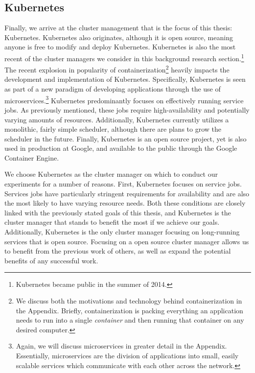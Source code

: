 \documentclass[twoside]{report}
\begin{document}
\subsection{Kubernetes}

Finally, we arrive at the cluster management that is the focus of this thesis:
Kubernetes. Kubernetes also originates, although it is open source, meaning
anyone is free to modify and deploy Kubernetes. Kubernetes is also the most
recent of the cluster managers we consider in this background research
section.\footnote{Kubernetes became public in the summer of 2014.} The recent
explosion in popularity of containerization\footnote{We discuss both the motivations and
technology behind containerization in the Appendix. Briefly, containerization is
packing everything an application needs to run into a single \textit{container}
and then running that container on any desired computer.}
heavily impacts the development and implementation of Kubernetes. Specifically,
Kubernetes is seen as part of a new paradigm of developing applications
through the use of microservices.\footnote{Again, we will
discuss microservices in greater detail
in the Appendix. Essentially, microservices are the division of applications
into small, easily scalable services which communicate with each other across
the network.} Kubernetes predominantly focuses on effectively running service
jobs. As previously mentioned, these jobs require
high-availability and potentially varying amounts of resources. Additionally,
Kubernetes currently utilizes a monolithic, fairly simple scheduler, although
there are plans to grow the scheduler in the future.\cite{k8s-design-overview}
Finally, Kubernetes is an open source project, yet is also used in production at
Google, and available to the public through the Google Container
Engine.\cite{google-container-engine}

We choose Kubernetes as the cluster manager on which to conduct our experiments
for a number of reasons. First, Kubernetes focuses on service jobs. Services jobs
have particularly stringent requirements for availability and are also the most
likely to have varying resource needs. Both these conditions are closely linked
with the previously stated goals of this thesis, and Kubernetes is the cluster
manager that stands to benefit the most if we achieve our goals. Additionally,
Kubernetes is the only cluster manager focusing on long-running services that is
open source. Focusing on a open source cluster manager allows us to benefit from
the previous work of others, as well as expand the potential benefits of any
successful work.
\end{document}
